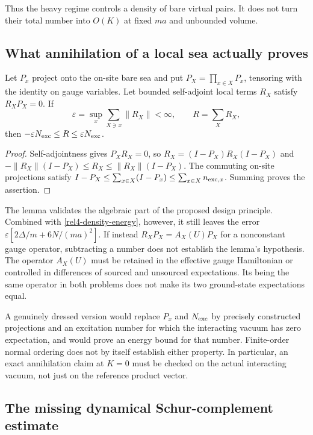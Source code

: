 Thus the heavy regime controls a density of bare virtual pairs.
It does not turn their total number into $O(K)$ at fixed $ma$ and
unbounded volume.

\subsection{What annihilation of a local sea actually proves}

\begin{lemma}
\label{rel4-annihilation}
Let $P_x$ project onto the on-site bare sea and put
$P_X=\prod_{x\in X}P_x$, tensoring with the identity on gauge variables.
Let bounded self-adjoint local terms $R_X$ satisfy $R_XP_X=0$.
If
\[
 \varepsilon=\sup_x\sum_{X\ni x}\|R_X\|<\infty,
 \qquad R=\sum_XR_X ,
\]
then $-\varepsilon N_{\rm exc}\le R\le\varepsilon N_{\rm exc}$.
\end{lemma}
\begin{proof}
Self-adjointness gives $P_XR_X=0$, so
$R_X=(I-P_X)R_X(I-P_X)$ and
$-\|R_X\|(I-P_X)\le R_X\le\|R_X\|(I-P_X)$.
The commuting on-site projections satisfy
$I-P_X\le\sum_{x\in X}(I-P_x)\le\sum_{x\in X}n_{{\rm exc},x}$.
Summing proves the assertion.
\end{proof}

The lemma validates the algebraic part of the proposed design
principle. Combined with \eqref{rel4-density-energy}, however, it
still leaves the error
$\varepsilon[2\Delta/m+6N/(ma)^2]$.
If instead $R_XP_X=A_X(U)P_X$ for a nonconstant gauge operator,
subtracting a number does not establish the lemma's hypothesis.
The operator $A_X(U)$ must be retained in the effective gauge
Hamiltonian or controlled in differences of sourced and unsourced
expectations. Its being the same operator in both problems does
not make its two ground-state expectations equal.

A genuinely dressed version would replace $P_x$ and $N_{\rm exc}$
by precisely constructed projections and an excitation number for
which the interacting vacuum has zero expectation, and would prove
an energy bound for that number. Finite-order normal ordering does
not by itself establish either property. In particular, an exact
annihilation claim at $K=0$ must be checked on the actual interacting
vacuum, not just on the reference product vector.

\subsection{The missing dynamical Schur-complement estimate}

